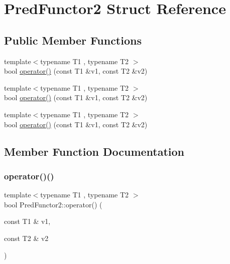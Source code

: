 \hypertarget{struct_pred_functor2}{}\section{Pred\+Functor2 Struct Reference}
\label{struct_pred_functor2}
\subsection*{Public Member Functions}
\begin{DoxyCompactItemize}
\item 
{\footnotesize template$<$typename T1 , typename T2 $>$ }\\bool \mbox{\hyperlink{struct_pred_functor2_a2142c86e4c0a3139e167dd3f13eb7f6f}{operator()}} (const T1 \&v1, const T2 \&v2)
\item 
{\footnotesize template$<$typename T1 , typename T2 $>$ }\\bool \mbox{\hyperlink{struct_pred_functor2_a2142c86e4c0a3139e167dd3f13eb7f6f}{operator()}} (const T1 \&v1, const T2 \&v2)
\item 
{\footnotesize template$<$typename T1 , typename T2 $>$ }\\bool \mbox{\hyperlink{struct_pred_functor2_a2142c86e4c0a3139e167dd3f13eb7f6f}{operator()}} (const T1 \&v1, const T2 \&v2)
\end{DoxyCompactItemize}


\subsection{Member Function Documentation}
\mbox{\label{struct_pred_functor2_a2142c86e4c0a3139e167dd3f13eb7f6f}} 
\subsubsection{\texorpdfstring{operator()()}{operator()()}\hspace{0.1cm}{\footnotesize\ttfamily [1/3]}}
{\footnotesize\ttfamily template$<$typename T1 , typename T2 $>$ \\
bool Pred\+Functor2\+::operator() (\begin{DoxyParamCaption}\item[{const T1 \&}]{v1,  }\item[{const T2 \&}]{v2 }\end{DoxyParamCaption})\hspace{0.3cm}{\ttfamily [inline]}}

